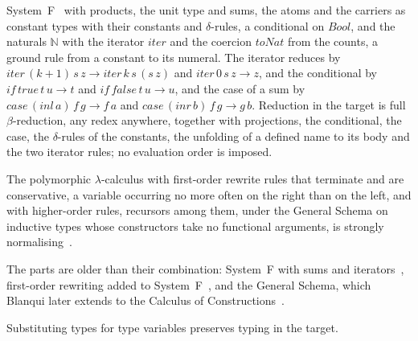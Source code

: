\begin{definition}
\label{def:target}
System~F~\cite{girard1989proofs} with products, the unit type and sums, the atoms and the carriers as constant types with their constants and $\delta$-rules, a conditional on $\mathit{Bool}$, and the naturals $\mathbb{N}$ with the iterator $\mathit{iter}$ and the coercion $\mathit{toNat}$ from the counts, a ground rule from a constant to its numeral.
The iterator reduces by $\mathit{iter}\,(k{+}1)\,s\,z \longrightarrow \mathit{iter}\,k\,s\,(s\,z)$ and $\mathit{iter}\,0\,s\,z \longrightarrow z$, and the conditional by $\mathit{if}\,\mathit{true}\,t\,u \longrightarrow t$ and $\mathit{if}\,\mathit{false}\,t\,u \longrightarrow u$, and the case of a sum by $\mathit{case}\,(\mathit{inl}\,a)\,f\,g \longrightarrow f\,a$ and $\mathit{case}\,(\mathit{inr}\,b)\,f\,g \longrightarrow g\,b$.
Reduction in the target is full $\beta$-reduction, any redex anywhere, together with projections, the conditional, the case, the $\delta$-rules of the constants, the unfolding of a defined name to its body and the two iterator rules; no evaluation order is imposed.
\end{definition}

\begin{citedtheorem}
\label{cit:sn}
The polymorphic $\lambda$-calculus with first-order rewrite rules that terminate and are conservative, a variable occurring no more often on the right than on the left, and with higher-order rules, recursors among them, under the General Schema on inductive types whose constructors take no functional arguments, is strongly normalising~\cite[Theorem~25]{jouannaud1997abstract}.
\end{citedtheorem}

The parts are older than their combination: System~F with sums and iterators~\cite{matthes1999extensions}, first-order rewriting added to System~F~\cite{breazutannen1991polymorphic,breazutannen1994polymorphic}, and the General Schema, which Blanqui later extends to the Calculus of Constructions~\cite{blanqui2005definitions}.

\begin{citedtheorem}
\label{cit:subst}
Substituting types for type variables preserves typing in the target.
\end{citedtheorem}

